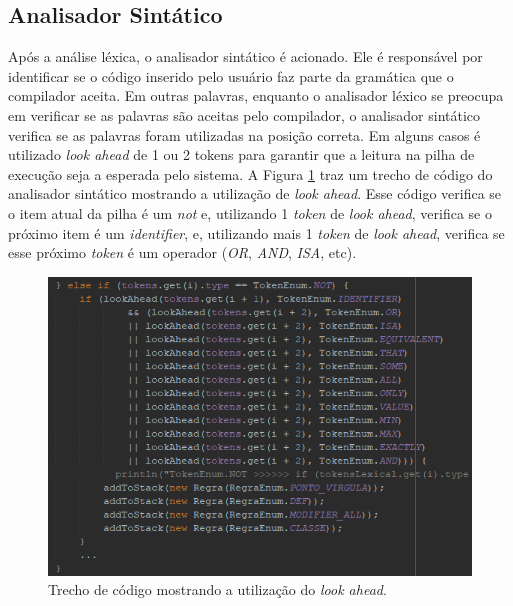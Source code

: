 \documentclass{bcc}
\begin{document}
\subsection{Analisador Sintático}


Após a análise léxica, o analisador sintático é acionado. Ele é responsável por identificar se o código inserido pelo usuário faz parte da gramática que o compilador aceita. Em outras palavras, enquanto o analisador léxico se preocupa em verificar se as palavras são aceitas pelo compilador, o analisador sintático verifica se as palavras foram utilizadas na posição correta. Em alguns casos é utilizado \textit{look ahead} de 1 ou 2 tokens para garantir que a leitura na pilha de execução seja a esperada pelo sistema. A Figura \ref{fig:codigoLookAhead} traz um trecho de código do analisador sintático mostrando a utilização de \textit{look ahead}. Esse código verifica se o item atual da pilha é um \textit{not} e, utilizando 1 \textit{token} de \textit{look ahead}, verifica se o próximo item é um \textit{identifier}, e, utilizando mais 1 \textit{token} de \textit{look ahead}, verifica se esse próximo \textit{token} é um operador (\textit{OR}, \textit{AND}, \textit{ISA}, etc).



\begin{figure}[H]
\centering
\includegraphics[width=.8\textwidth]{Figuras/codigo_lookahead.png}
\caption{Trecho de código mostrando a utilização do \textit{look ahead}. }
\label{fig:codigoLookAhead}
\end{figure}
\end{document}
